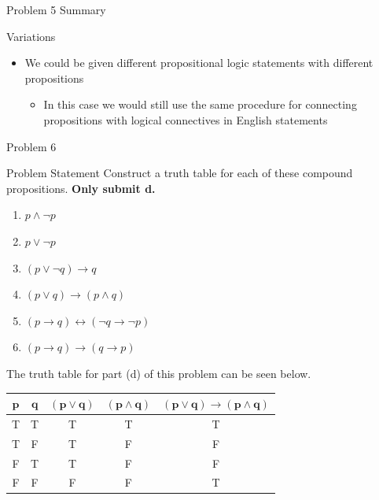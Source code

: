 \begin{summary}{Problem 5 Summary}
\begin{statement}{Variations}
\begin{itemize}
\begin{itemize}
            \end{itemize}
            \item We could be given different propositional logic statements with different propositions
            \begin{itemize}
                \item In this case we would still use the same procedure for connecting propositions with logical connectives in English statements
            \end{itemize}
        \end{itemize}
    \end{statement}
\end{summary}

\begin{problem}{Problem 6}
    \begin{statement}{Problem Statement}
        Construct a truth table for each of these compound propositions. \textbf{Only submit d.}

        \begin{enumerate}[label=(\alph*)]
            \item $p \wedge \neg p$
            \item $p \vee \neg p$
            \item $(p \vee \neg q) \rightarrow q$
            \item $(p \vee q) \rightarrow (p \wedge q)$
            \item $(p \rightarrow q) \leftrightarrow (\neg q \rightarrow \neg p)$
            \item $(p \rightarrow q) \rightarrow (q \rightarrow p)$
        \end{enumerate}
    \end{statement}

    \begin{Highlight}
        The truth table for part (d) of this problem can be seen below.

        \begin{center}
            \begin{tabular}[h]{|c|c|c|c|c|}
                \hline $\mathbf{p}$ & $\mathbf{q}$ & $\mathbf{(p \vee q)}$ & $\mathbf{(p \wedge q)}$ & $\mathbf{(p \vee q)} \rightarrow \mathbf{(p \wedge q)}$ \\ \hline
                T & T & T & T & T \\ \hline
                T & F & T & F & F \\ \hline
                F & T & T & F & F \\ \hline
                F & F & F & F & T \\ \hline
            \end{tabular}
        \end{center}
    \end{Highlight}
\end{problem}

